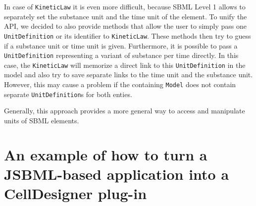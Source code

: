 \documentclass[
  BCOR12mm,
  letterpaper,
  11pt,
  headsepline,
  pointlessnumbers,
  tablecaptionabove,
  headinclude,
  appendixprefix,
  idxtotoc,
  bibtotoc,
  twoside,
  titlepage
]{scrartcl}
\begin{document}
In case of \verb!KineticLaw! it is even more difficult, because
SBML Level 1 allows to separately set the substance unit and the time unit of
the element. To unify the API, we decided to also provide methods that allow
the user to simply pass one \verb!UnitDefinition! or its identifier to
\verb!KineticLaw!. These methods then try to guess if a substance unit or time
unit is given. Furthermore, it is possible to pass a \verb!UnitDefinition!
representing a variant of substance per time directly. In this case, the
\verb!KineticLaw! will memorize a direct link to this \verb!UnitDefinition! in
the model and also try to save separate links to the time unit and the substance
unit. However, this may cause a problem if the containing \verb!Model! does not
contain separate \verb!UnitDefinition!s for both enties.

Generally, this approach provides a more general way to access and manipulate
units of SBML elements.

\appendix

\section{An example of how to turn a JSBML-based application into a CellDesigner
plug-in}
\end{document}
